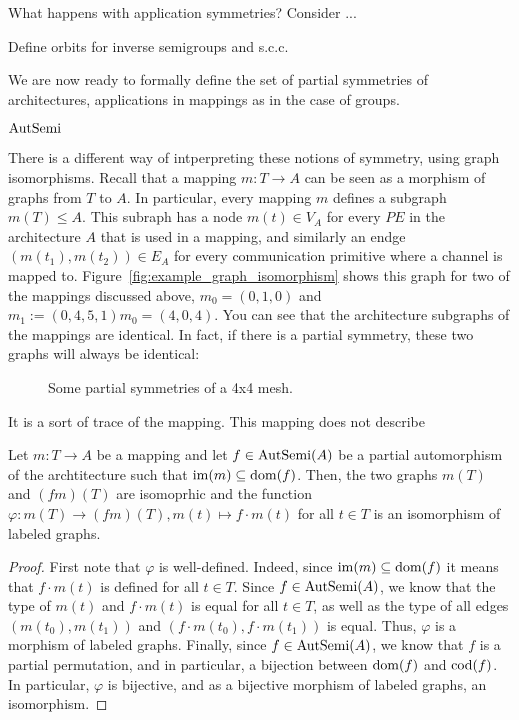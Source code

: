 What happens with application symmetries? Consider ...

Define orbits for inverse semigroups and s.c.c.

We are now ready to formally define the set of partial symmetries of architectures, applications in mappings as in the case of groups.
\begin{defn}
$\operatorname{AutSemi}$
\end{defn}

There is a different way of intperpreting these notions of symmetry, using graph isomorphisms.
Recall that a mapping $m: T \rightarrow A$ can be seen as a morphism of graphs from $T$ to $A$.
In particular, every mapping $m$ defines a subgraph $m(T) \leq A$.
This subraph has a node $m(t) \in V_A$ for every $PE$ in the architecture $A$ that is used in a mapping, and similarly an endge $(m(t_1),m(t_2)) \in E_A$ for every communication primitive where a channel is mapped to.
Figure~\ref{fig:example_graph_isomorphism} shows this graph for two of the mappings discussed above, $m_0 = (0,1,0)$ and $m_1 := (0,4,5,1)m_0 = (4,0,4)$. 
You can see that the architecture subgraphs of the mappings are identical. In fact, if there is a partial symmetry, these two graphs will always be identical:

\begin{figure}[h]
	\centering
   \resizebox{0.55\textwidth}{!}{}
	\caption{Some partial symmetries of a 4x4 mesh.}
	\label{fig:partial_symmetries_4x4}
\end{figure}
It is a sort of trace of the mapping. This mapping does not describe 

\begin{lem}
\label{lem:symmetry_to_iso}
Let $m : T \rightarrow A$ be a mapping and let $f \in \operatorname{AutSemi}(A)$ be a partial automorphism of the archtitecture such that $\operatorname{im}(m) \subseteq \operatorname{dom}(f)$. Then, the two graphs $m(T)$ and $(fm)(T)$ are isomoprhic and the function $\varphi: m(T) \rightarrow (fm)(T), m(t) \mapsto f \cdot m(t)$ for all $t \in T$ is an isomorphism of labeled graphs.
\begin{proof}
First note that $\varphi$ is well-defined. Indeed, since $\operatorname{im}(m) \subseteq \operatorname{dom}(f)$ it means that $f \cdot m(t)$ is defined for all $t \in T$. Since $f \in \operatorname{AutSemi}(A)$, we know that the type of $m(t)$ and $f \cdot m(t)$ is equal for all $t \in T$, as well as the type of all edges $(m(t_0),m(t_1))$ and  $(f \cdot m(t_0), f \cdot m(t_1))$ is equal. Thus, $\varphi$ is a morphism of labeled graphs. Finally, since $f \in \operatorname{AutSemi}(A)$, we know that $f$ is a partial permutation, and in particular, a bijection between $\operatorname{dom}(f)$ and $\operatorname{cod}(f)$. In particular, $\varphi$ is bijective, and as a bijective morphism of labeled graphs, an isomorphism. 
\end{proof}
\end{lem}

